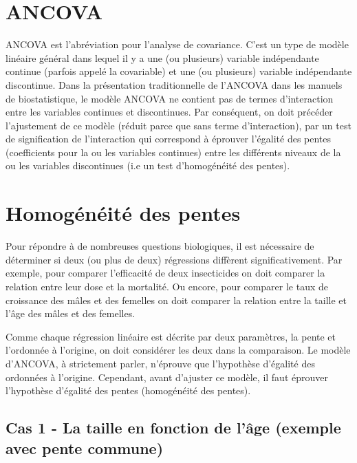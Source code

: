 \documentclass[12pt,]{book}
\begin{document}
\hypertarget{ancova}{%
\section{ANCOVA}\label{ancova}}

ANCOVA est l'abréviation pour l'analyse de covariance. C'est un type de modèle linéaire général dans lequel il y a une (ou plusieurs) variable indépendante continue (parfois appelé la covariable) et une (ou plusieurs) variable indépendante discontinue. Dans la présentation traditionnelle de l'ANCOVA dans les manuels de biostatistique, le modèle ANCOVA ne contient pas de termes d'interaction entre les variables continues et discontinues. Par conséquent, on doit précéder l'ajustement de ce modèle (réduit parce que sans terme d'interaction), par un test de signification de l'interaction qui correspond à éprouver l'égalité des pentes (coefficients pour la ou les variables continues) entre les différents niveaux de la ou les variables discontinues (i.e un test d'homogénéité des pentes).

\hypertarget{homoguxe9nuxe9ituxe9-des-pentes}{%
\section{Homogénéité des pentes}\label{homoguxe9nuxe9ituxe9-des-pentes}}

Pour répondre à de nombreuses questions biologiques, il est nécessaire de déterminer si deux (ou plus de deux) régressions diffèrent significativement. Par exemple, pour comparer l'efficacité de deux insecticides on doit comparer la relation entre leur dose et la mortalité. Ou encore, pour comparer le taux de croissance des mâles et des femelles on doit comparer la relation entre la taille et l'âge des mâles et des femelles.

Comme chaque régression linéaire est décrite par deux paramètres, la pente et l'ordonnée à l'origine, on doit considérer les deux dans la comparaison. Le modèle d'ANCOVA, à strictement parler, n'éprouve que l'hypothèse d'égalité des ordonnées à l'origine. Cependant, avant d'ajuster ce modèle, il faut éprouver l'hypothèse d'égalité des pentes (homogénéité des pentes).

\hypertarget{cas-1---la-taille-en-fonction-de-luxe2ge-exemple-avec-pente-commune}{%
\subsection{Cas 1 - La taille en fonction de l'âge (exemple avec pente commune)}\label{cas-1---la-taille-en-fonction-de-luxe2ge-exemple-avec-pente-commune}}
\end{document}
